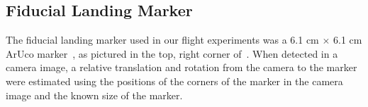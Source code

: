 
\subsection{Fiducial Landing Marker}
The fiducial landing marker used in our flight experiments was a 6.1 cm $\times$ 6.1 cm ArUco
marker~\cite{romero2018speeded}, as pictured in the top, right corner
of~.
When detected in a camera image, a relative translation and
rotation from the camera to the marker were estimated using the positions of
the corners of the marker in the camera image and the known size of the marker. 

